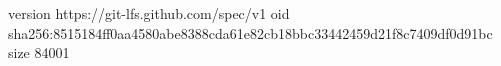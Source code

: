 version https://git-lfs.github.com/spec/v1
oid sha256:8515184ff0aa4580abe8388cda61e82cb18bbc33442459d21f8c7409df0d91bc
size 84001
